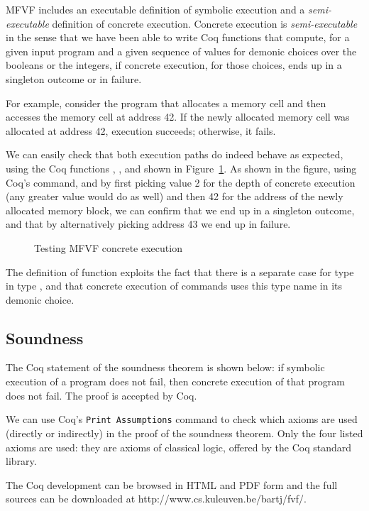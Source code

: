 \documentclass{CSML}
\theoremstyle{definition}\newtheorem{notation}[thm]{Notation}
\theoremstyle{plain}\newtheorem{satz}[thm]{Satz}
\begin{document}
MFVF includes an executable definition of symbolic execution and a 
\emph{semi-executable} definition of concrete execution. Concrete 
execution is \emph{semi-executable} in the sense that we have been able to 
write Coq functions that compute, for a given input program and a given 
sequence of values for demonic choices over the booleans or the integers, 
if concrete execution, for those choices, ends up in a singleton outcome 
or in failure.

For example, consider the program that allocates a memory cell and then 
accesses the memory cell at address 42. If the newly allocated memory cell 
was allocated at address 42, execution succeeds; otherwise, it fails.

We can easily check that both execution paths do indeed behave as 
expected, using the Coq functions , , and 
 shown in Figure~\ref{fig:mfvf-cexec}. As shown in the figure, using Coq's  command, 
and by first picking value 2 for the depth of concrete execution (any 
greater value would do as well) and then 42 for the address of the newly 
allocated memory block, we can confirm that we end up in a singleton 
outcome, and that by alternatively picking address 43 we end up in 
failure.

\begin{figure}

\caption{Testing MFVF concrete execution}\label{fig:mfvf-cexec}
\end{figure}

The definition of function  exploits the fact 
that there is a separate case for type  in type 
, and that concrete execution of 
 commands uses this type name in its demonic choice. 

\subsection{Soundness}

The Coq statement of the soundness theorem is shown below: if symbolic 
execution of a program does not fail, then concrete execution of that 
program does not fail. The proof is accepted by Coq.

\medskip

\noindent We can use Coq's \texttt{Print Assumptions} command to check which axioms 
are used (directly or indirectly) in the proof of the soundness theorem. 
Only the four listed axioms are used: they are axioms of classical logic, 
offered by the Coq standard library. 

The Coq development can be browsed in HTML and PDF form and the full 
sources can be downloaded at \textsf{http://www.cs.kuleuven.be/bartj/fvf/}.
\end{document}
